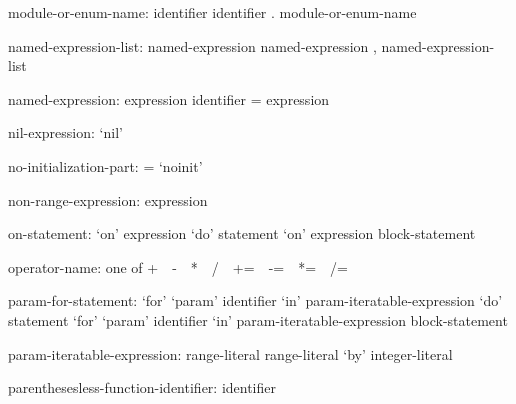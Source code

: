 \begin{syntax}
module-or-enum-name:
  identifier
  identifier . module-or-enum-name
\end{syntax}

\begin{syntax}
named-expression-list:
  named-expression
  named-expression , named-expression-list
\end{syntax}

\begin{syntax}
named-expression:
  expression
  identifier = expression
\end{syntax}

\begin{syntax}
nil-expression:
  `nil'
\end{syntax}

\begin{syntax}
no-initialization-part:
  = `noinit'
\end{syntax}

\begin{syntax}
non-range-expression:
   expression
\end{syntax}

\begin{syntax}
on-statement:
  `on' expression `do' statement
  `on' expression block-statement
\end{syntax}

\begin{syntax}
operator-name: one of
  + $ $ $ $ - $ $ $ $ * $ $ $ $ / $ $ $ $ %
  += $ $ $ $ -= $ $ $ $ *= $ $ $ $ /= $ $ $ $ %
\end{syntax}

\begin{syntax}
param-for-statement:
  `for' `param' identifier `in' param-iteratable-expression `do' statement
  `for' `param' identifier `in' param-iteratable-expression block-statement
\end{syntax}

\begin{syntax}
param-iteratable-expression:
  range-literal
  range-literal `by' integer-literal
\end{syntax}

\begin{syntax}
parenthesesless-function-identifier:
  identifier
\end{syntax}

